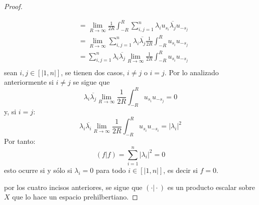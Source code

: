\documentclass[12pt]{report}
\theoremstyle{largebreak}
\newcommand\abs[1]{\ensuremath{\big|#1\big|}}
\newcommand\pint[2]{\ensuremath{\left(#1\big|#2\right)}}
\newcommand\conj[1]{\ensuremath{\overline{#1}}}
\begin{document}
\begin{proof}
\begin{enumerate}
\begin{equation*}
\begin{split}
                    &= \lim_{R\rightarrow\infty }\frac{1}{2R}\int_{-R}^{R}\sum_{i,j=1 }^n \lambda_i u_{s_i }\conj{\lambda_j}u_{ -s_j} \\
                    &= \lim_{R\rightarrow\infty }\sum_{i,j=1 }^n\lambda_i\conj{\lambda_j}\frac{1}{2R}\int_{-R}^{R}  u_{s_i }u_{ -s_j} \\
                    &= \sum_{i,j=1 }^n\lambda_i\conj{\lambda_j}\lim_{R\rightarrow\infty }\frac{1}{2R}\int_{-R}^{R} u_{s_i }u_{ -s_j} \\
                \end{split}
            \end{equation*}
            sean $i,j\in\left[|1,n|\right]$, se tienen dos casos, $i\neq j$ o $i=j$. Por lo analizado anteriormente si $i\neq j$ se sigue que
            \begin{equation*}
                \lambda_i\conj{\lambda_j}\lim_{R\rightarrow\infty }\frac{1}{2R}\int_{-R}^{R}u_{s_i }u_{ -s_j}=0
            \end{equation*}
            y, si $i=j$:
            \begin{equation*}
                \lambda_i\conj{\lambda_i}\lim_{R\rightarrow\infty }\frac{1}{2R}\int_{-R}^{R}u_{s_i }u_{ -s_i}=\abs{\lambda_i}^2
            \end{equation*}
            Por tanto:
            \begin{equation*}
                \pint{f}{f}=\sum_{ i=1}^n\abs{\lambda_i}^2=0
            \end{equation*}
            esto ocurre si y sólo si $\lambda_i=0$ para todo $i\in\left[|1,n|\right]$, es decir si $f=0$.
        \end{enumerate}
        por los cuatro incisos anteriores, se sigue que $\pint{\cdot}{\cdot}$ es un producto escalar sobre $X$ que lo hace un espacio prehilbertiano.


\end{proof}
\end{document}
